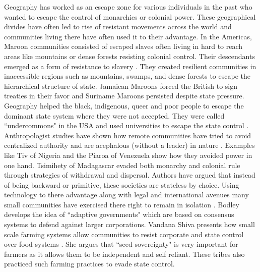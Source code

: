 \begin{sloppypar}
Geography has worked as an escape zone for various individuals in the past who wanted to escape the control of monarchies or colonial power. These geographical divides have often led to rise of resistant movements across the world and communities living there have often used it to their advantage. In the Americas, Maroon communities consisted of escaped slaves often living in hard to reach areas like mountains or dense forests resisting colonial control. Their descendants emerged as a form of resistance to slavery \citep{price2020rainforest}. They created resilient communities in inaccessible regions such as mountains, swamps, and dense forests to escape the hierarchical structure of state. Jamaican Maroons forced the British to sign treaties in their favor and Suriname Maroons persisted despite state pressure. Geography helped the  black, indigenous, queer and poor people to escape the dominant state system where they were not accepted. They were called ``undercommons" in the USA and used  universities to escape the state control \citep{harney2013undercommons}. Anthropologist studies have shown how remote communities have tried to avoid centralized authority and are acephalous (without a leader) in nature \citep{graeber2004fragments}. Examples like Tiv of Nigeria and the Piaroa of Venezuela show how they avoided power in one hand. Tsimihety of Madagascar evaded both monarchy and colonial rule through strategies of withdrawal and dispersal. Authors have argued that instead of being backward or primitive, these societies are stateless by choice. Using technology to there advantage along with legal and international avenues many small communities have exercised there right to remain in isolation \citep{bodley2012anthropology,bodley2014victims}. Bodley develops the idea of ``adaptive governments" which are based on consensus systems to defend against larger corporations. Vandana Shiva presents how small scale farming systems allow communities to resist corporate and state control over food systems \citep{hrynkow2018}. She argues that ``seed sovereignty" is very important for farmers as it allows them to be independent and self reliant. These tribes also practiced such farming practices to evade state control.  


\end{sloppypar}
